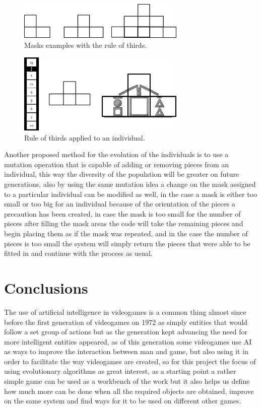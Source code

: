 \documentclass[graybox]{svmult}
\begin{document}
\begin{figure}[htbp]
    \centerline{\includegraphics[width=80mm]{Images/mask_distribution.png}}
    \caption{Masks examples with the rule of thirds.}
    \label{fig}
\end{figure}

\begin{figure}[htbp]
    \centerline{\includegraphics[width=80mm]{Images/chromosome_thirds.png}}
    \caption{Rule of thirds applied to an individual.}
    \label{fig}
\end{figure}

Another proposed method for the evolution of the individuals is to use a mutation operation that is capable of adding or removing pieces from an individual, this way the diversity of the population will be greater on future generations, also by using the same mutation idea a change on the mask assigned to a particular individual can be modified as well, in the case a mask is either too small or too big for an individual because of the orientation of the pieces a precaution has been created, in case the mask is too small for the number of pieces after filling the mask areas the code will take the remaining pieces and begin placing them as if the mask was repeated, and in the case the number of pieces is too small the system will simply return the pieces that were able to be fitted in and continue with the process as usual.

\section{Conclusions}

The use of artificial intelligence in videogames is a common thing almost since before the first generation of videogames on 1972 as simply entities that would follow a set group of actions but as the generation kept advancing the need for more intelligent entities appeared, as of this generation some videogames use AI as ways to improve the interaction between man and game, but also using it in order to facilitate the way videogames are created, so for this project the focus of using evolutionary algorithms as great interest, as a starting point a rather simple game can be used as a workbench of the work but it also helps us define how much more can be done when all the required objects are obtained, improve on the same system and find ways for it to be used on different other games.



\end{document}
